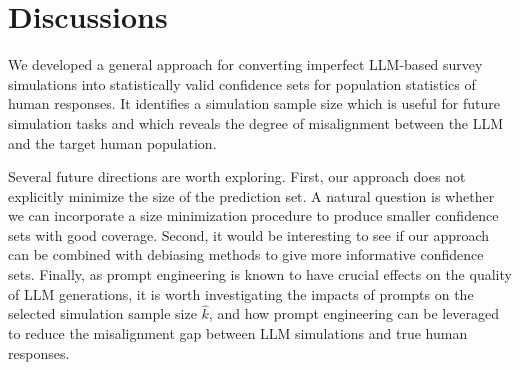 \section{Discussions}\label{sec-discussions}

We developed a general approach for converting imperfect LLM-based survey simulations into statistically valid confidence sets for population statistics of human responses. It identifies a simulation sample size which is useful for future simulation tasks and which reveals the degree of misalignment between the LLM and the target human population. 

Several future directions are worth exploring. First, our approach does not explicitly minimize the size of the prediction set. A natural question is whether we can incorporate a size minimization procedure to produce smaller confidence sets with good coverage. Second, it would be interesting to see if our approach can be combined with debiasing methods to give more informative confidence sets. Finally, as prompt engineering is known to have crucial effects on the quality of LLM generations, it is worth investigating the impacts of prompts on the selected simulation sample size $\widehat{k}$, and how prompt engineering can be leveraged to reduce the misalignment gap between LLM simulations and true human responses.
